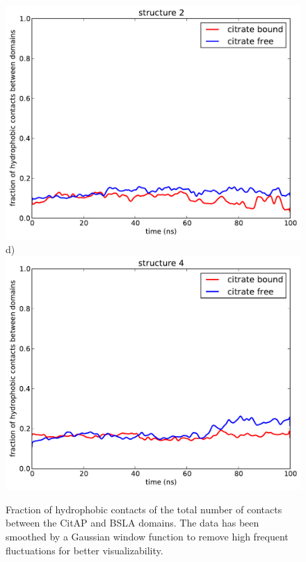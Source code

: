 \documentclass[english, a4paper, 12pt, titlepage, draft]{article}
\begin{document}
\begin{figure}
\begin{minipage}[]{0.45\linewidth}
        \includegraphics[width=\textwidth]{figures/Complex_hydrophobic_core/hydrophobic_cont_structure2.pdf}  
        d)
        \includegraphics[width=\textwidth]{figures/Complex_hydrophobic_core/hydrophobic_cont_structure4.pdf}  
    \end{minipage}
    \caption{Fraction of hydrophobic contacts of the total number of contacts between the CitAP and BSLA domains.
        The data has been smoothed by a Gaussian window function to remove high frequent fluctuations for better visualizability.}
\label{fig:hydrophobic_contacts}
\end{figure}    
\end{document}
